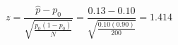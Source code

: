 

\[
z = \frac{\hat{p} - p_0}{\sqrt{\frac{p_0(1 - p_0)}{N}}} = \frac{0.13 - 0.10}{\sqrt{\frac{0.10(0.90)}{200}}} = 1.414
\]


